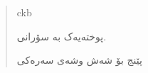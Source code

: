 \renewcommand{\abstractname}{پوختە}
\begin{abstract}
    \markboth{\abstractname}{}
\begin{scontents}[store-env=lang]
ckb
\end{scontents}
\begin{scontents}[store-env=abstracts,print-env=true]
پوختەیەک بە سۆرانی.
\end{scontents}

\begin{scontents}[store-env=keywords,print-env=true]
پێنج بۆ شەش وشەی سەرەکی
\end{scontents}
\end{abstract}
\cleardoublepage
{}

